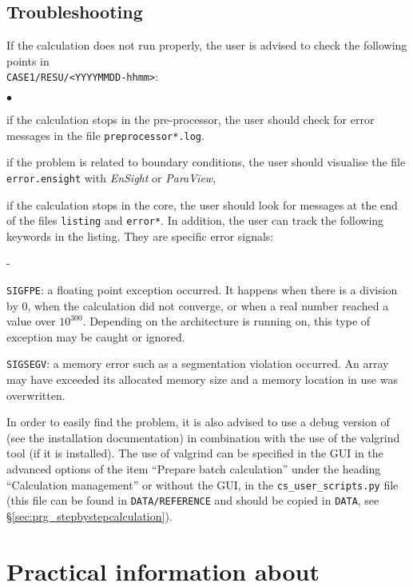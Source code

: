 \subsection{Troubleshooting}
If the calculation does not run properly, the user is advised to check the
following points in\\
\texttt{CASE1/RESU/<YYYYMMDD-hhmm>}:
\begin{list}{$\bullet$}{}
\item  if the calculation stops in the pre-processor, the user should check for error messages in the file \texttt{preprocessor*.log}.
\item if the problem is related to boundary conditions, the user should visualise the file \texttt{error.ensight} with {\em EnSight} or {\em ParaView},
\item if the calculation stops in the \CS core, the user should look for messages at the end of the files \texttt{listing} and \texttt{error*}. In addition, the user can track the following keywords in the listing. They are specific error signals:
  \begin{list}{-}{}
  \item  \texttt{SIGFPE}: a floating point exception occurred. It happens when there is a division by 0, when the calculation did not converge, or when a real number reached a value over $10^{300}$. Depending on the architecture \CS is running
on, this type of exception may be caught or ignored.
  \item  \texttt{SIGSEGV}: a memory error such as a segmentation violation occurred. An array may have exceeded its allocated memory size and a memory location in use was overwritten.
  \end{list}
In order to easily find the problem, it is also advised to use a debug version of \CS (see the installation documentation) in combination with the use of the valgrind tool (if it is installed). The use of valgrind can be specified in the GUI in the advanced options of the item ``Prepare batch calculation'' under the heading ``Calculation management'' or without the GUI, in the \texttt{cs\_user\_scripts.py} file (this file can be found in \texttt{DATA/REFERENCE} and should be copied in \texttt{DATA}, see \S\ref{sec:prg_stepbystepcalculation}).
\end{list}
\section{Practical information about \CS}

